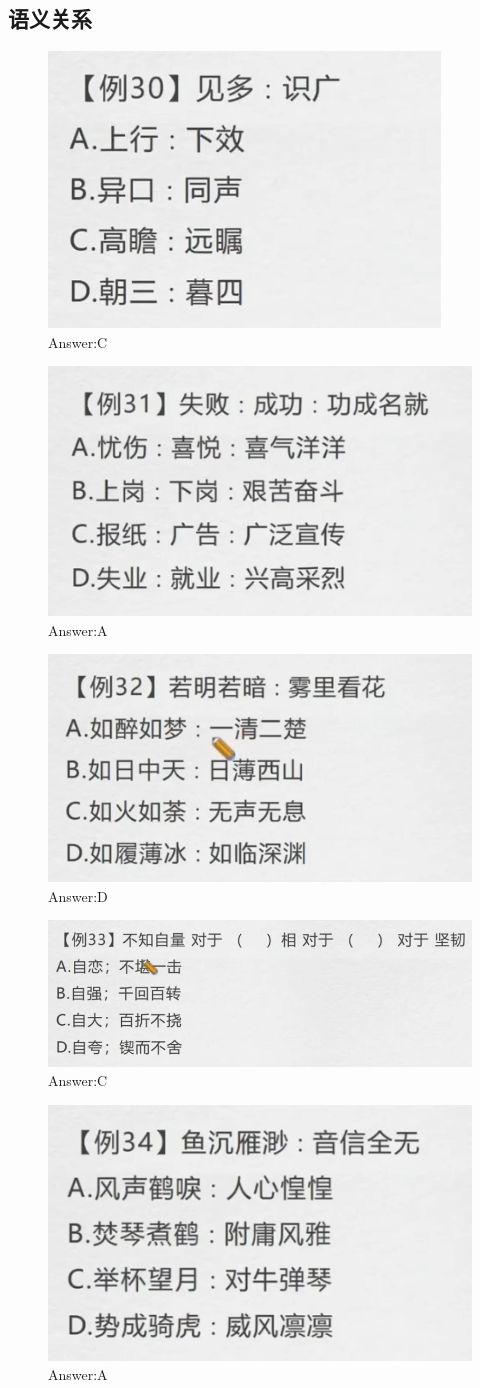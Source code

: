 \documentclass{article}
\numberwithin{equation}{section}						%
\numberwithin{figure}{section}							%
\begin{document}
\begin{sloppypar}
\subsection{语义关系}

\begin{figure}[H]
     \centering
     \includegraphics[width=0.4\linewidth]{130.png}
		\caption{Answer:C}
\end{figure}

\begin{figure}[H]
     \centering
     \includegraphics[width=0.4\linewidth]{131.png}
		\caption{Answer:A}
\end{figure}

\begin{figure}[H]
     \centering
     \includegraphics[width=0.4\linewidth]{132.png}
		\caption{Answer:D}
\end{figure}


\begin{figure}[H]
     \centering
     \includegraphics[width=0.4\linewidth]{133.png}
		\caption{Answer:C}
\end{figure}

\begin{figure}[H]
     \centering
     \includegraphics[width=0.4\linewidth]{134.png}
		\caption{Answer:A}
\end{figure}



\end{sloppypar}
\end{document}
